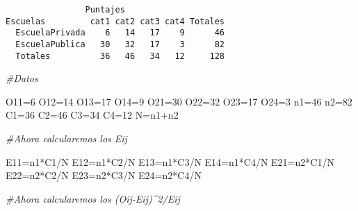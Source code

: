 \documentclass[
  a4paper,
  oneside,
  openany]{book}
\newenvironment{Shaded}{\begin{snugshade}}{\end{snugshade}}
\newcommand{\CommentTok}[1]{\textcolor[rgb]{0.56,0.35,0.01}{\textit{#1}}}
\newcommand{\DecValTok}[1]{\textcolor[rgb]{0.00,0.00,0.81}{#1}}
\newcommand{\NormalTok}[1]{#1}
\newcommand{\OtherTok}[1]{\textcolor[rgb]{0.56,0.35,0.01}{#1}}
\newcommand{\SpecialCharTok}[1]{\textcolor[rgb]{0.00,0.00,0.00}{#1}}
\begin{document}
\begin{verbatim}
                Puntajes
Escuelas         cat1 cat2 cat3 cat4 Totales
  EscuelaPrivada    6   14   17    9      46
  EscuelaPublica   30   32   17    3      82
  Totales          36   46   34   12     128
\end{verbatim}

\begin{Shaded}
\begin{Highlighting}[]
\CommentTok{\#Datos}

\NormalTok{O11}\OtherTok{=}\DecValTok{6}
\NormalTok{O12}\OtherTok{=}\DecValTok{14}
\NormalTok{O13}\OtherTok{=}\DecValTok{17}
\NormalTok{O14}\OtherTok{=}\DecValTok{9}
\NormalTok{O21}\OtherTok{=}\DecValTok{30}
\NormalTok{O22}\OtherTok{=}\DecValTok{32}
\NormalTok{O23}\OtherTok{=}\DecValTok{17}
\NormalTok{O24}\OtherTok{=}\DecValTok{3}
\NormalTok{n1}\OtherTok{=}\DecValTok{46}
\NormalTok{n2}\OtherTok{=}\DecValTok{82}
\NormalTok{C1}\OtherTok{=}\DecValTok{36}
\NormalTok{C2}\OtherTok{=}\DecValTok{46}
\NormalTok{C3}\OtherTok{=}\DecValTok{34}
\NormalTok{C4}\OtherTok{=}\DecValTok{12}
\NormalTok{N}\OtherTok{=}\NormalTok{n1}\SpecialCharTok{+}\NormalTok{n2}

\CommentTok{\#Ahora calcularemos los Eij}

\NormalTok{E11}\OtherTok{=}\NormalTok{n1}\SpecialCharTok{*}\NormalTok{C1}\SpecialCharTok{/}\NormalTok{N}
\NormalTok{E12}\OtherTok{=}\NormalTok{n1}\SpecialCharTok{*}\NormalTok{C2}\SpecialCharTok{/}\NormalTok{N}
\NormalTok{E13}\OtherTok{=}\NormalTok{n1}\SpecialCharTok{*}\NormalTok{C3}\SpecialCharTok{/}\NormalTok{N}
\NormalTok{E14}\OtherTok{=}\NormalTok{n1}\SpecialCharTok{*}\NormalTok{C4}\SpecialCharTok{/}\NormalTok{N}
\NormalTok{E21}\OtherTok{=}\NormalTok{n2}\SpecialCharTok{*}\NormalTok{C1}\SpecialCharTok{/}\NormalTok{N}
\NormalTok{E22}\OtherTok{=}\NormalTok{n2}\SpecialCharTok{*}\NormalTok{C2}\SpecialCharTok{/}\NormalTok{N}
\NormalTok{E23}\OtherTok{=}\NormalTok{n2}\SpecialCharTok{*}\NormalTok{C3}\SpecialCharTok{/}\NormalTok{N}
\NormalTok{E24}\OtherTok{=}\NormalTok{n2}\SpecialCharTok{*}\NormalTok{C4}\SpecialCharTok{/}\NormalTok{N}

\CommentTok{\#Ahora calcularemos los (Oij{-}Eij)\^{}2/Eij}


\end{Highlighting}
\end{Shaded}
\end{document}
